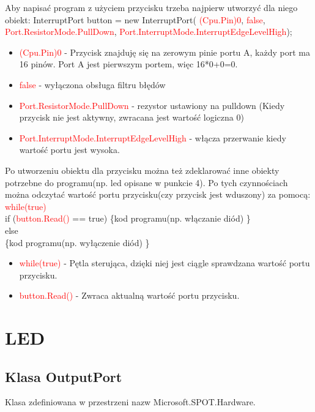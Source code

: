 \documentclass{article}
\begin{document}
Aby napisać program z użyciem przycisku trzeba najpierw utworzyć dla niego obiekt:\newline \newline
InterruptPort button = 
new InterruptPort(\space \textcolor{red}{ (Cpu.Pin)0}, \space \textcolor{red}{ false},\space \textcolor{red}{ Port.ResistorMode.PullDown}, \space \textcolor{red}{ Port.InterruptMode.InterruptEdgeLevelHigh});
\begin{itemize}
\item \textcolor{red}{(Cpu.Pin)0} - Przycisk znajduję się na zerowym pinie portu A, każdy port ma 16 pinów. Port A jest pierwszym portem, więc 16*0+0=0.
\item \textcolor{red}{false} - wyłączona obsługa filtru błędów
\item \textcolor{red}{Port.ResistorMode.PullDown} - rezystor ustawiony na pulldown (Kiedy przycisk nie jest aktywny, zwracana jest wartość logiczna 0)
\item \textcolor{red}{Port.InterruptMode.InterruptEdgeLevelHigh} - włącza przerwanie kiedy wartość portu jest wysoka.
\end{itemize}
Po utworzeniu obiektu dla przycisku można też zdeklarować inne obiekty potrzebne do programu(np. led opisane w punkcie 4). Po tych czynnościach można odczytać wartość portu przycisku(czy przycisk jest wduszony) za pomocą:\newline\\
\textcolor{red}{while(true)}\\
 if (\textcolor{red}{button.Read()} == true)\newline
 \{kod programu(np. włączanie diód) \}\\
 else\\
 \{kod programu(np. wyłączenie diód) \}\\
 
 \begin{itemize}
\item \textcolor{red}{while(true)} - Pętla sterująca, dzięki niej jest ciągle sprawdzana wartość portu przycisku.
\item \textcolor{red}{button.Read()} - Zwraca aktualną wartość portu przycisku.
\end{itemize}
 
 
\section{LED}
\subsection{Klasa OutputPort}
Klasa zdefiniowana w przestrzeni nazw Microsoft.SPOT.Hardware.
\end{document}
